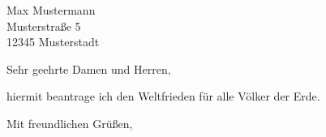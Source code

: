 \documentclass[
    BriefVorlage, %
]{scrlttr2}
\begin{document}
\begin{letter}{%
Max Mustermann\\
Musterstraße 5\\
12345 Musterstadt
}

\opening{Sehr geehrte Damen und Herren,}

hiermit beantrage ich den Weltfrieden für alle Völker der Erde. 

\closing{Mit freundlichen Grüßen,}




\end{letter}
\end{document}
